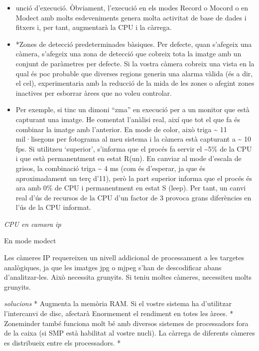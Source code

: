\documentclass[
  10pt,
]{krantz}
\providecommand{\tightlist}{%
  \setlength{\itemsep}{0pt}\setlength{\parskip}{0pt}}
\begin{document}
\begin{itemize}
\tightlist
\item
  unció d'execució. Òbviament, l'execució en els modes Record o Mocord o en Modect amb molts esdeveniments genera molta activitat de base de dades i fitxers i, per tant, augmentarà la CPU i la càrrega.
\item
  *Zones de detecció predeterminades bàsiques. Per defecte, quan s'afegeix una càmera, s'afegeix una zona de detecció que cobreix tota la imatge amb un conjunt de paràmetres per defecte. Si la vostra càmera cobreix una vista en la qual és poc probable que diverses regions generin una alarma vàlida (és a dir, el cel), experimentaria amb la reducció de la mida de les zones o afegint zones inactives per esborrar àrees que no voleu controlar.
\item
  Per exemple, si tinc un dimoni ``zma'' \hspace{0pt}\hspace{0pt}en execució per a un monitor que està capturant una imatge. He comentat l'anàlisi real, així que tot el que fa és combinar la imatge amb l'anterior. En mode de color, això triga \textasciitilde{} 11 mil·lisegons per fotograma al meu sistema i la càmera està capturant a \textasciitilde{} 10 fps. Si utilitzeu `superior', s'informa que el procés fa servir el \textasciitilde5\% de la CPU i que està permanentment en estat R(un). En canviar al mode d'escala de grisos, la combinació triga \textasciitilde{} 4 ms (com és d'esperar, ja que és aproximadament un terç d'11), però la part superior informa que el procés és ara amb 0\% de CPU i permanentment en estat S (leep). Per tant, un canvi real d'ús de recursos de la CPU d'un factor de 3 provoca grans diferències en l'ús de la CPU informat.
\end{itemize}

\emph{CPU en camara ip}

En mode modect

Les càmeres IP requereixen un nivell addicional de processament a les targetes analògiques, ja que les imatges jpg o mjpeg s'han de descodificar abans d'analitzar-les. Això necessita grunyits. Si teniu moltes càmeres, necessiteu molts grunyits.

\emph{solucions} * Augmenta la memòria RAM. Si el vostre sistema ha d'utilitzar l'intercanvi de disc, afectarà Enormement el rendiment en totes les àrees. * Zoneminder també funciona molt bé amb diversos sistemes de processadors fora de la caixa (si SMP està habilitat al vostre nucli). La càrrega de diferents càmeres es distribueix entre els processadors. *
\end{document}
